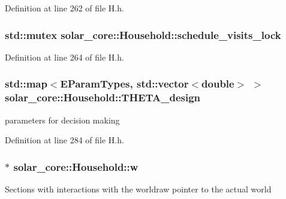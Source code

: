 Definition at line 262 of file H.\+h.

\hypertarget{classsolar__core_1_1_household_a15e598cfc419040a23f75fe08a8ef1d8}{}
\subsubsection[{schedule\+\_\+visits\+\_\+lock}]{\setlength{\rightskip}{0pt plus 5cm}std\+::mutex solar\+\_\+core\+::\+Household\+::schedule\+\_\+visits\+\_\+lock\hspace{0.3cm}{\ttfamily [protected]}}\label{classsolar__core_1_1_household_a15e598cfc419040a23f75fe08a8ef1d8}


Definition at line 264 of file H.\+h.

\hypertarget{classsolar__core_1_1_household_a7c0f5fb9f84a1d971e770fc677e7d8de}{}
\subsubsection[{T\+H\+E\+T\+A\+\_\+design}]{\setlength{\rightskip}{0pt plus 5cm}std\+::map$<${\bf E\+Param\+Types}, std\+::vector$<$double$>$ $>$ solar\+\_\+core\+::\+Household\+::\+T\+H\+E\+T\+A\+\_\+design\hspace{0.3cm}{\ttfamily [protected]}}\label{classsolar__core_1_1_household_a7c0f5fb9f84a1d971e770fc677e7d8de}
parameters for decision making 

Definition at line 284 of file H.\+h.

\hypertarget{classsolar__core_1_1_household_a01ac4643c725f397ba7485209a906e4d}{}
\subsubsection[{w}]{$\ast$ solar\+\_\+core\+::\+Household\+::w\hspace{0.3cm}{\ttfamily [protected]}}\label{classsolar__core_1_1_household_a01ac4643c725f397ba7485209a906e4d}
Sections with interactions with the worldraw pointer to the actual world 


